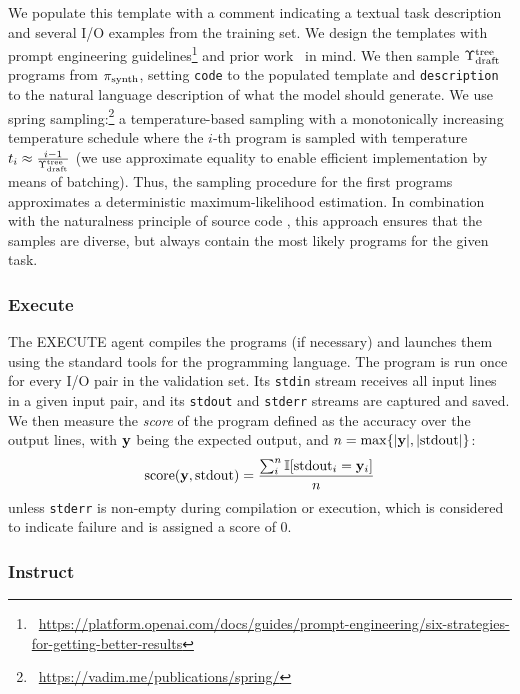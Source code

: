 We populate this template with a comment indicating a textual task description and several I/O examples from the training set.
We design the templates with prompt engineering guidelines\footnote{~\url{https://platform.openai.com/docs/guides/prompt-engineering/six-strategies-for-getting-better-results}} and prior work~\cite{debruin2021:autoencoders} in mind.
We then sample $\Upsilon^\text{tree}_\text{draft}$ programs from $ \pi_\text{synth} $, setting \texttt{code} to the populated template and \texttt{description} to the natural language description of what the model should generate.
We use spring sampling:\footnote{~\url{https://vadim.me/publications/spring/}} a temperature-based sampling with a monotonically increasing temperature schedule where the $i$-th program is sampled with temperature $t_i \approx \frac{i-1}{\Upsilon^\text{tree}_\text{draft}}$ (we use approximate equality to enable efficient implementation by means of batching).
Thus, the sampling procedure for the first programs approximates a deterministic maximum-likelihood estimation.
In combination with the naturalness principle of source code \cite{allamanis2018:survey,jiang2022:bugs}, this approach ensures that the samples are diverse, but always contain the most likely programs for the given task.

\subsubsection{Execute}
\label{sec:seidr-execute}

The EXECUTE agent compiles the programs (if necessary) and launches them using the standard tools for the programming language.
The program is run once for every I/O pair in the validation set. 
Its \texttt{stdin} stream receives all input lines in a given input pair, and its \texttt{stdout} and \texttt{stderr} streams are captured and saved.
We then measure the \emph{score} of the program defined as the accuracy over the output lines, with $\mathbf{y}{}$ being the expected output, and $n=\max\{|\mathbf{y}{}|, |\text{stdout}|\}$:
\[    
\text{score}(\mathbf{y}{}, \text{stdout}) = \frac{\sum^{n}_i{\mathbb{I}[\text{stdout}_i = \mathbf{y}_i]}}{n} 
\]
unless \texttt{stderr} is non-empty during compilation or execution, which is considered to indicate failure and is assigned a score of 0.

\subsubsection{Instruct}
\label{sec:seidr-instruct}

